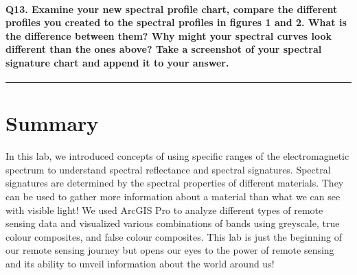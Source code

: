 \documentclass[
]{book}
\begin{document}
\hypertarget{q13.-examine-your-new-spectral-profile-chart-compare-the-different-profiles-you-created-to-the-spectral-profiles-in-figures-1-and-2.-what-is-the-difference-between-them-why-might-your-spectral-curves-look-different-than-the-ones-above-take-a-screenshot-of-your-spectral-signature-chart-and-append-it-to-your-answer.}{%
\paragraph*{Q13. Examine your new spectral profile chart, compare the different profiles you created to the spectral profiles in figures 1 and 2. What is the difference between them? Why might your spectral curves look different than the ones above? Take a screenshot of your spectral signature chart and append it to your answer.}\label{q13.-examine-your-new-spectral-profile-chart-compare-the-different-profiles-you-created-to-the-spectral-profiles-in-figures-1-and-2.-what-is-the-difference-between-them-why-might-your-spectral-curves-look-different-than-the-ones-above-take-a-screenshot-of-your-spectral-signature-chart-and-append-it-to-your-answer.}}

\begin{center}\rule{0.5\linewidth}{0.5pt}\end{center}

\hypertarget{summary}{%
\section*{Summary}\label{summary}}

In this lab, we introduced concepts of using specific ranges of the electromagnetic spectrum to understand spectral reflectance and spectral signatures. Spectral signatures are determined by the spectral properties of different materials. They can be used to gather more information about a material than what we can see with visible light! We used ArcGIS Pro to analyze different types of remote sensing data and visualized various combinations of bands using greyscale, true colour composites, and false colour composites. This lab is just the beginning of our remote sensing journey but opens our eyes to the power of remote sensing and its ability to unveil information about the world around us!
\end{document}
